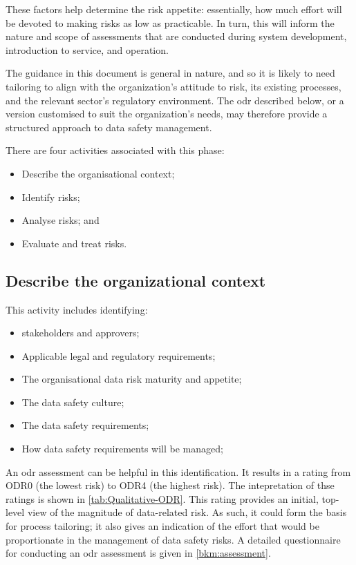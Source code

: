These factors help determine the risk appetite: essentially, how much effort will be devoted to making risks as low as practicable. In turn, this will inform the nature and scope of assessments that are conducted during system development, introduction to service, and operation.

The guidance in this document is general in nature, and so it is likely to need \gls{tailoring} to align with the organization's attitude to risk, its existing processes, and the relevant sector's regulatory environment. The \gls{odr} described below, or a version customised to suit the organization's needs, may therefore provide a structured approach to data safety management.

There are four activities associated with this phase:
\begin{itemize}
	\item Describe the organisational context;
	\item Identify risks;
	\item Analyse risks; and
	\item Evaluate and treat risks.
\end{itemize}

\subsection{Describe the organizational context}
This activity includes identifying:
\begin{itemize}
	\item \Glspl{stakeholder} and approvers;
	\item Applicable legal and regulatory requirements;
	\item The organisational data risk maturity and appetite;
	\item The data safety culture;
	\item The \glspl{data safety requirement};
	\item How \glspl{data safety requirement} will be managed;
\end{itemize}
An \gls{odr} assessment can be helpful in this identification. It results in a rating from ODR0 (the lowest risk) to ODR4 (the highest risk). The intepretation of thse ratings is shown in \ref{tab:Qualitative-ODR}. This rating provides an initial, top-level view of the magnitude of data-related risk. As such, it could form the basis for process \gls{tailoring}; it also gives an indication of the effort that would be proportionate in the management of data safety risks. A detailed questionnaire for conducting an \gls{odr} assessment is given in \ref{bkm:assessment}. 


